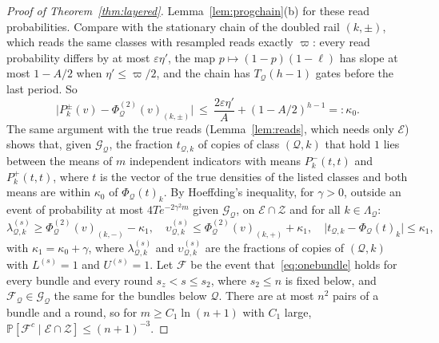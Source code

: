\documentclass[11pt]{amsart}
\theoremstyle{definition}
\theoremstyle{remark}
\newcommand{\eps}{\varepsilon}
\newcommand{\PP}{\mathbb{P}}
\begin{document}
\begin{proof}[Proof of Theorem~\ref{thm:layered}]
Lemma~\ref{lem:progchain}(b) for these read probabilities. Compare with the stationary chain of the
doubled rail $(k,\pm)$, which reads the same classes with resampled reads exactly $\varpi$: every
read probability differs by at most $\eps\eta'$, the map $p\mapsto(1-p)(1-\ell)$ has slope at most
$1-A/2$ when $\eta'\le\varpi/2$, and the chain has $T_{\mathcal Q}(h-1)$ gates before the last
period. So
\begin{equation}\label{eq:Pphi}
\bigl|P^\pm_k(v)-\Phi^{(2)}_{\mathcal Q}(v)_{(k,\pm)}\bigr|\ \le\ \frac{2\eps\eta'}{A}+(1-A/2)^{h-1}=:\kappa_0 .
\end{equation}
The same argument with the true reads (Lemma~\ref{lem:reads}, which needs only $\mathcal E$) shows
that, given $\mathcal G_{\mathcal Q}$, the fraction $t_{\mathcal Q,k}$ of copies of class
$(\mathcal Q,k)$ that hold $1$ lies between the means of $m$ independent indicators with means
$P^-_k(t,t)$ and $P^+_k(t,t)$, where $t$ is the vector of the true densities of the listed classes
and both means are within $\kappa_0$ of $\Phi_{\mathcal Q}(t)_k$. By Hoeffding's inequality, for
$\gamma>0$, outside an event of probability at most $4Te^{-2\gamma^2m}$ given
$\mathcal G_{\mathcal Q}$, on $\mathcal E\cap\mathcal Z$ and for all $k\in\Lambda_{\mathcal Q}$:
\begin{equation}\label{eq:onebundle}
\lambda^{(s)}_{\mathcal Q,k}\ge\Phi^{(2)}_{\mathcal Q}(v)_{(k,-)}-\kappa_1,\quad
\upsilon^{(s)}_{\mathcal Q,k}\le\Phi^{(2)}_{\mathcal Q}(v)_{(k,+)}+\kappa_1,\quad
\bigl|t_{\mathcal Q,k}-\Phi_{\mathcal Q}(t)_k\bigr|\le\kappa_1,
\end{equation}
with $\kappa_1=\kappa_0+\gamma$, where $\lambda^{(s)}_{\mathcal Q,k}$ and $\upsilon^{(s)}_{\mathcal Q,k}$ are
the fractions of copies of $(\mathcal Q,k)$ with $L^{(s)}=1$ and $U^{(s)}=1$. Let $\mathcal F$ be the
event that~\eqref{eq:onebundle} holds for every bundle and every round $s_z<s\le s_2$, where
$s_2\le n$ is fixed below, and $\mathcal F_{\mathcal Q}\in\mathcal G_{\mathcal Q}$ the same for the
bundles below $\mathcal Q$. There are at most $n^2$ pairs of a bundle and a round, so for
$m\ge C_1\ln(n+1)$ with $C_1$ large, $\PP[\mathcal F^c\mid\mathcal E\cap\mathcal Z]\le(n+1)^{-3}$.


\end{proof}
\end{document}
